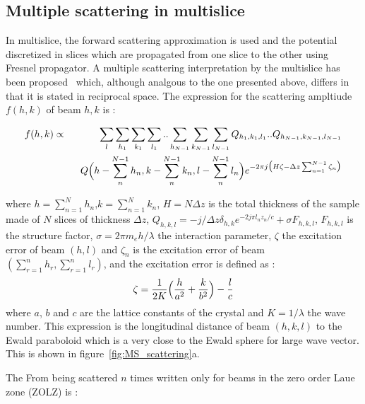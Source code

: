 \subsection{Multiple scattering in multislice}
In multislice, the forward scattering approximation is used and the
potential discretized in slices which are propagated from one slice to
the other using Fresnel propagator.
A multiple scattering interpretation by the multislice has been
proposed~\cite{ColweyModdie1957} which, although analgous to the
one presented above, differs in that it is stated in reciprocal space.
The expression for the scattering ampltiude $f(h,k)$ of beam $h,k$ is :
%
\begin{widetext}
\begin{eqnarray*}
  f(h,k) &\propto&
    \sum_{l}\sum_{h_1}\sum_{k_1}\sum_{l_1}..\sum_{h_{N-1}}\sum_{k_{N-1}}\sum_{l_{N-1}}
    Q_{h_1,k_1,l_1}..Q_{h_{N-1},k_{N-1},l_{N-1}}\\
  &&~~Q\Bigl(h-\sum_{n}^{N-1}h_n,k-\sum_{n}^{N-1}k_n,l-\sum_{n}^{N-1}l_n\Bigr)
  e^{-2\pi j\bigl(H\zeta - \Delta z\sum_{n=1}^{N-1}\zeta_n\bigr)}
\end{eqnarray*}
\end{widetext}
%
where $h=\sum_{n=1}^N h_n$,$k=\sum_{n=1}^N k_n$,
$H=N\Delta z$ is the total thickness of the sample made of $N$ slices
of thickness $\Delta z$,
$Q_{h,k,l}=-j/\Delta z\delta_{h,k}e^{-2j\pi l_n z_n/c} + \sigma F_{h,k,l}$,
$F_{h,k,l}$ is the structure factor,
$\sigma=2\pi m_eh/\lambda$ the interaction parameter,
$\zeta$ the excitation error of beam $(h,l)$ and
$\zeta_n$ is the excitation error of beam
$\left(\sum_{r=1}^{n} h_r,\sum_{r=1}^n l_r\right)$,
and the excitation error is defined as :
%
\begin{equation*}
  \zeta = \frac{1}{2K}\Bigl(\frac{h}{a^2} + \frac{k}{b^2}\Bigr) - \frac{l}{c}
\end{equation*}
%
where $a$, $b$ and $c$ are the lattice constants of the crystal and
$K=1/\lambda$ the wave number.
This expression is the longitudinal distance of beam $(h,k,l)$ to
the Ewald paraboloid which is a very close to the Ewald sphere
for large wave vector. This is shown in figure~\ref{fig:MS_scattering}a.

The From being scattered $n$ times
written only for beams in the zero order Laue zone (ZOLZ) is :


